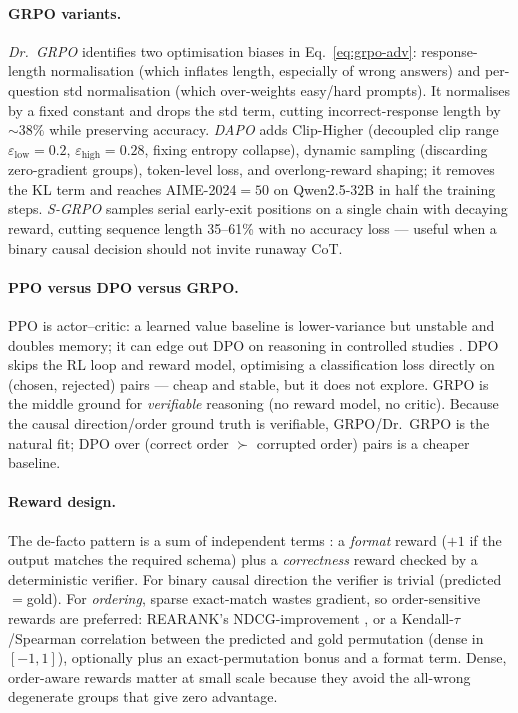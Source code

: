 \paragraph{GRPO variants.} \emph{Dr.\ GRPO} \citep{rl:liu2025drgrpo} identifies
two optimisation biases in Eq.~\ref{eq:grpo-adv}: response-length normalisation
(which inflates length, especially of wrong answers) and per-question std
normalisation (which over-weights easy/hard prompts). It normalises by a fixed
constant and drops the std term, cutting incorrect-response length by ${\sim}38\%$
while preserving accuracy. \emph{DAPO} \citep{rl:yu2025dapo} adds Clip-Higher
(decoupled clip range $\varepsilon_{\text{low}}{=}0.2$,
$\varepsilon_{\text{high}}{=}0.28$, fixing entropy collapse), dynamic sampling
(discarding zero-gradient groups), token-level loss, and overlong-reward shaping;
it removes the KL term and reaches AIME-2024$=50$ on Qwen2.5-32B in half the
training steps. \emph{S-GRPO} \citep{rl:sgrpo2025} samples serial early-exit
positions on a single chain with decaying reward, cutting sequence length 35--61\%
with no accuracy loss --- useful when a binary causal decision should not invite
runaway CoT.

\paragraph{PPO versus DPO versus GRPO.} PPO \citep{rl:schulman2017ppo} is
actor--critic: a learned value baseline is lower-variance but unstable and
doubles memory; it can edge out DPO on reasoning in controlled studies
\citep{rl:ivison2024ppodpo}. DPO \citep{rl:rafailov2023dpo} skips the RL loop and
reward model, optimising a classification loss directly on (chosen, rejected)
pairs --- cheap and stable, but it does not explore. GRPO is the middle ground for
\emph{verifiable} reasoning (no reward model, no critic). Because the causal
direction/order ground truth is verifiable, GRPO/Dr.\ GRPO is the natural fit;
DPO over (correct order $\succ$ corrupted order) pairs is a cheaper baseline.

\paragraph{Reward design.} The de-facto pattern is a sum of independent terms
\citep{rl:deepseekr1}: a \emph{format} reward ($+1$ if the output matches the
required schema) plus a \emph{correctness} reward checked by a deterministic
verifier. For binary causal direction the verifier is trivial
(predicted$=$gold). For \emph{ordering}, sparse exact-match wastes gradient, so
order-sensitive rewards are preferred: REARANK's NDCG-improvement
\citep{rl:zhang2025rearank}, or a Kendall-$\tau$/Spearman correlation between the
predicted and gold permutation (dense in $[-1,1]$), optionally plus an
exact-permutation bonus and a format term. Dense, order-aware rewards matter at
small scale because they avoid the all-wrong degenerate groups that give zero
advantage.

